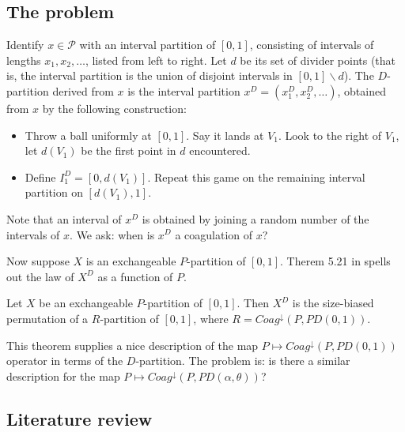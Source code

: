 \subsection{The problem}%

Identify $x \in \mathcal{P}$ with an interval partition of $[0,1]$, consisting of intervals of lengths $x_1, x_2, \ldots$, listed from left to right. Let $d$ be its set of divider points (that is, the interval partition is the union of disjoint intervals in $[0,1] \backslash d$). 
The $D$-partition derived from $x$ is the interval partition $x^D = (x^D_1, x^D_2, \ldots)$, obtained from $x$ by the following construction:
\begin{itemize}
  \item Throw a ball uniformly at $[0,1]$. Say it lands at $V_1$. Look to the right of $V_1$, let $d(V_1)$ be the first point in $d$ encountered. 
  \item Define $I^D_1 = [0,d(V_1)]$. Repeat this game on the remaining interval partition on $[d(V_1), 1]$. 
\end{itemize}
Note that an interval of $x^D$ is obtained by joining a random number of the intervals of $x$. We ask: when is $x^D$ a coagulation of $x$?

Now suppose $X$ is an exchangeable $P$-partition of $[0,1]$. Therem 5.21 in \cite{MR2245368} spells out the law of $X^D$ as a function of $P$. 

\begin{theorem}\label{thm:5.21}
Let $X$ be an exchangeable $P$-partition of $[0,1]$. Then $X^D$ is the size-biased permutation of a $R$-partition of $[0,1]$, where $R = Coag^\downarrow(P,PD(0,1))$. 
\end{theorem}

This theorem supplies a nice description of the map $P \mapsto Coag^\downarrow(P,PD(0,1))$ operator in terms of the $D$-partition. The problem is: is there a similar description for the map $P \mapsto Coag^\downarrow(P,PD(\alpha,\theta))$? 

\subsection{Literature review} %


